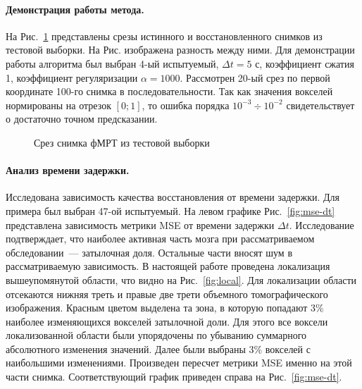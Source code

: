 \documentclass[a4paper, 12pt]{extarticle}
\begin{document}
\paragraph*{Демонстрация работы метода.}

На Рис.~\ref*{fig:example} представлены срезы истинного и восстановленного снимков из
тестовой выборки. На Рис. изображена разность между ними.
Для демонстрации работы алгоритма был выбран 4-ый испытуемый, $\Delta t = 5 \text{ с}$, коэффициент сжатия 1, коэффициент регуляризации
$\alpha = 1000$. Рассмотрен 20-ый срез по первой координате 100-го снимка в последовательности.
Так как значения вокселей нормированы на отрезок $[0; 1]$, то ошибка порядка $10^{-3} \div 10^{-2}$
свидетельствует о достаточно точном предсказании.

\begin{figure}[h!]
	\centering
	\hfill
	\hfill
	\caption{Срез снимка фМРТ из тестовой выборки}
	\label{fig:example}
\end{figure}

\paragraph*{Анализ времени задержки.}

Исследована зависимость качества восстановления от времени задержки.
Для примера был выбран 47-ой испытуемый.
На левом графике Рис.~\ref{fig:mse-dt} представлена зависимость метрики MSE
от времени задержки $\Delta t$.
Исследование \citep{anderson2006} подтверждает, что наиболее активная часть мозга
при рассматриваемом обследовании~--- затылочная доля.
Остальные части вносят шум в рассматриваемую зависимость.
В настоящей работе проведена локализация вышеупомянутой области, 
что видно на Рис.~\ref{fig:local}.
Для локализации области отсекаются нижняя треть и правые две трети объемного
томографического изображения.
Красным цветом выделена та зона, в которую попадают 3\% наиболее 
изменяющихся вокселей затылочной доли.
Для этого все воксели локализованной области были упорядочены по 
убыванию суммарного абсолютного изменения значений.
Далее были выбраны 3\% вокселей с наибольшими изменениями.
Произведен пересчет метрики MSE именно на этой части снимка.
Соответствующий график приведен справа на Рис.~\ref{fig:mse-dt}.
\end{document}
